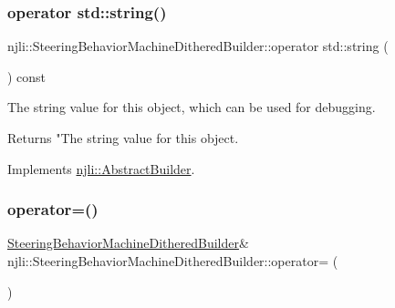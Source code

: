 \subsubsection{\texorpdfstring{operator std\+::string()}{operator std::string()}}
{\footnotesize\ttfamily njli\+::\+Steering\+Behavior\+Machine\+Dithered\+Builder\+::operator std\+::string (\begin{DoxyParamCaption}{ }\end{DoxyParamCaption}) const\hspace{0.3cm}{\ttfamily [virtual]}}

The string value for this object, which can be used for debugging.

\begin{DoxyReturn}{Returns}
"The string value for this object. 
\end{DoxyReturn}


Implements \mbox{\hyperlink{classnjli_1_1_abstract_builder_a3e6e553e06d1ca30517ad5fb0bd4d000}{njli\+::\+Abstract\+Builder}}.

\mbox{\label{classnjli_1_1_steering_behavior_machine_dithered_builder_a57a306e8528bdc367b1b0b7a6e7526dd}} 
\subsubsection{\texorpdfstring{operator=()}{operator=()}}
{\footnotesize\ttfamily \mbox{\hyperlink{classnjli_1_1_steering_behavior_machine_dithered_builder}{Steering\+Behavior\+Machine\+Dithered\+Builder}}\& njli\+::\+Steering\+Behavior\+Machine\+Dithered\+Builder\+::operator= (\begin{DoxyParamCaption}\item[{const \mbox{\hyperlink{classnjli_1_1_steering_behavior_machine_dithered_builder}{Steering\+Behavior\+Machine\+Dithered\+Builder}} \&}]{ }\end{DoxyParamCaption})\hspace{0.3cm}{\ttfamily [protected]}}

\mbox{\label{classnjli_1_1_steering_behavior_machine_dithered_builder_aa0a6e2d4c927b58257fb72e9b10736ed}} 
